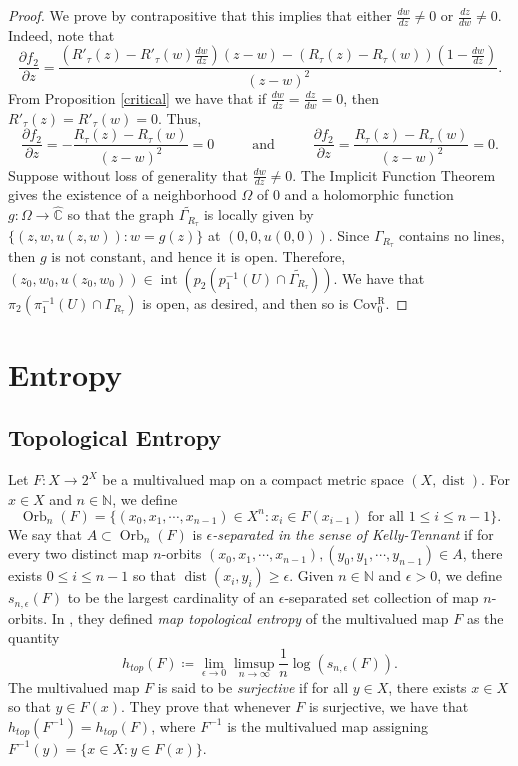 \documentclass[11pt,letterpaper]{article}
\theoremstyle{definition}
\def\covr{\operatorname{Cov^R_0}}
\def\interior{\operatorname{int}}
\def\orb{\operatorname{Orb}}
\begin{document}
\begin{proof}
We prove by contrapositive that this implies that either $\frac{dw}{dz}\neq 0$ or $\frac{dz}{dw}\neq 0$. Indeed, note that
$$\frac{\partial f_2}{\partial z}=\frac{(R'_\tau(z)-R'_\tau(w)\frac{dw}{dz})(z-w)-(R_\tau(z)-R_\tau(w))(1-\frac{dw}{dz})}{(z-w)^2}.$$
From Proposition \ref{critical} we have that if $\frac{dw}{dz}=\frac{dz}{dw}=0$, then $R'_\tau(z)=R'_\tau(w)=0$. Thus,
$$\frac{\partial f_2}{\partial z}=-\frac{R_\tau(z)-R_\tau(w)}{(z-w)^2}=0\hspace{1cm}\mbox{ and }\hspace{1cm}\frac{\partial f_2}{\partial z}=\frac{R_\tau(z)-R_\tau(w)}{(z-w)^2}=0.$$
Suppose without loss of generality that $\frac{dw}{dz}\neq 0$. The Implicit Function Theorem gives the existence of a neighborhood $\Omega$ of $0$ and a holomorphic function $g:\Omega\to\widehat{\mathbb{C}}$ so that the graph $\widetilde{\Gamma_{R_\tau}}$ is locally given by $\lbrace (z,w,u(z,w)):w=g(z)\rbrace$ at $(0,0,u(0,0))$. Since $\Gamma_{R_\tau}$ contains no lines, then $g$ is not constant, and hence it is open. Therefore, $(z_0,w_0,u(z_0,w_0))\in\interior(p_2(p_1^{-1}(U)\cap\widetilde{\Gamma_{R_\tau}}))$. We have that $\pi_2(\pi_1^{-1}(U)\cap\Gamma_{R_\tau})$ is open, as desired, and then so is $\covr$.
\end{proof}

\section{Entropy}\label{ent}
\subsection{Topological Entropy}

Let $F:X\to 2^X$ be a multivalued map on a compact metric space $(X,\operatorname{dist})$. For $x\in X$ and $n\in\mathbb{N}$, we define
$$\orb_n(F)=\lbrace (x_0,x_1,\cdots,x_{n-1})\in X^n :x_i\in F(x_{i-1})\mbox{ for all }1\leq i\leq n-1\rbrace.$$
We say that $A\subset\orb_n(F)$ is \emph{$\epsilon$-separated in the sense of Kelly-Tennant} if for every two distinct map $n$-orbits $(x_0,x_1,\cdots,x_{n-1}),(y_0,y_1,\cdots,y_{n-1})\in A$, there exists $0\leq i\leq n-1$ so that $\operatorname{dist}(x_i,y_i)\geq\epsilon$. Given $n\in\mathbb{N}$ and $\epsilon>0$, we define $s_{n,\epsilon}(F)$ to be the largest cardinality of an $\epsilon$-separated set collection of map $n$-orbits.
In \cite{KelTen17}, they defined \emph{map topological entropy} of the multivalued map $F$ as the quantity
$$h_{top}(F)\coloneqq\lim\limits_{\epsilon\to 0}\limsup\limits_{n\to\infty}\frac{1}{n}\log(s_{n,\epsilon}(F)).$$
The multivalued map $F$ is said to be  \emph{surjective} if for all $y\in X$, there exists $x\in X$ so that $y\in F(x)$. They prove that whenever $F$ is surjective, we have that $h_{top}(F^{-1})=h_{top}(F)$, where $F^{-1}$ is the multivalued map assigning $F^{-1}(y)=\lbrace x\in X: y\in F(x)\rbrace$.
\end{document}
